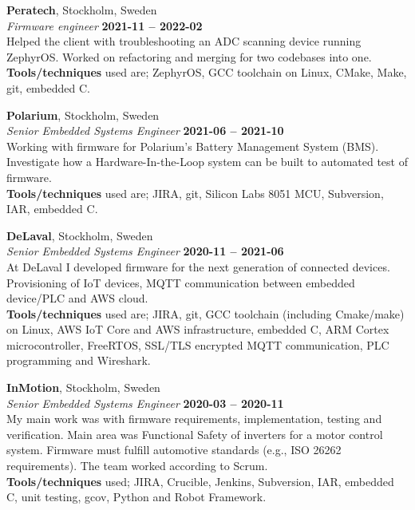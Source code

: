 \documentclass[a4paper,margin,line]{res} \usepackage{latexsym}
\begin{document}
\begin{resume}
\vspace{10mm}
{\bf Peratech}, Stockholm, Sweden\\
{\em Firmware engineer} \hfill {\bf 2021-11 -- 2022-02}\\
Helped the client with troubleshooting an ADC scanning device running
ZephyrOS. Worked on refactoring and merging for two codebases into one.\\ 
{\bf Tools/techniques} used are; ZephyrOS, GCC toolchain on
Linux, CMake, Make, git, embedded C.


{\bf Polarium}, Stockholm, Sweden\\
{\em Senior Embedded Systems Engineer} \hfill {\bf 2021-06 -- 2021-10}\\
Working with firmware for Polarium's Battery Management System (BMS).
Investigate how a Hardware-In-the-Loop system can be built to automated
test of firmware. \\ {\bf Tools/techniques} used are; JIRA, git, Silicon Labs 8051
MCU, Subversion, IAR, embedded C.


{\bf DeLaval}, Stockholm, Sweden\\
{\em Senior Embedded Systems Engineer} \hfill {\bf 2020-11 --
  2021-06}\\ At DeLaval I developed firmware for the next
generation of connected devices. Provisioning of IoT devices, MQTT
communication between embedded device/PLC and AWS
cloud. \\ {\bf Tools/techniques} used are; JIRA, git, GCC toolchain
(including Cmake/make) on Linux, AWS IoT Core and AWS infrastructure,
embedded C, ARM Cortex microcontroller, FreeRTOS, SSL/TLS encrypted
MQTT communication, PLC programming and Wireshark.


{\bf InMotion}, Stockholm, Sweden\\
{\em Senior Embedded Systems Engineer} \hfill {\bf 2020-03 --
  2020-11}\\ My main work was with firmware requirements,
implementation, testing and verification. Main area was Functional
Safety of inverters for a motor control system. Firmware must fulfill
automotive standards (e.g., ISO 26262 requirements). The team worked
according to Scrum. \\ {\bf Tools/techniques} used; JIRA, Crucible, Jenkins,
Subversion, IAR, embedded C, unit testing, gcov, Python and Robot
Framework.


\end{resume}
\end{document}

